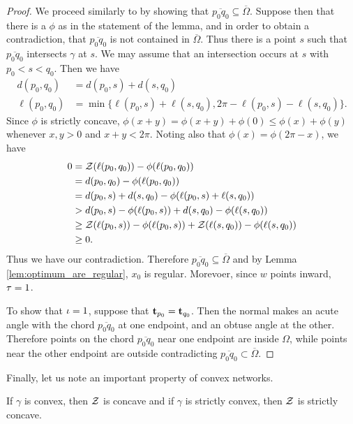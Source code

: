 \documentclass[12pt]{amsart}
\begin{document}
\begin{proof}
We proceed similarly to \cite{MR2794630} by showing that $\overline{p_0q_0} \subseteq \overline{\Omega}$. Suppose then that there is a $\phi$ as in the statement of the lemma, and in order to obtain a contradiction, that $\overline{p_0q_0}$ is not contained in $\overline{\Omega}$. Thus there is a point $s$ such that $\overline{p_0q_0}$ intersects $\gamma$ at $s$. We may assume that an intersection occurs at $s$ with $p_0 < s < q_0$. Then we have
\begin{align*}
d(p_0, q_0) &= d(p_0, s) + d(s, q_0) \\
\ell(p_0, q_0) &= \min\{\ell(p_0, s) + \ell(s, q_0),  2\pi -\ell(p_0,s ) - \ell(s, q_0)\}.
\end{align*}
Since $\phi$ is strictly concave, $\phi(x + y) = \phi(x + y) + \phi(0) \leq \phi(x) + \phi(y)$ whenever $x, y > 0$ and $x + y < 2\pi$. Noting also that $\phi(x) = \phi(2\pi - x)$, we have
\[
\begin{split}
0 &= \operatorname{\mathcal{Z}}(\ell(p_0, q_0)) - \phi(\ell(p_0, q_0)) \\
&=  d(p_0, q_0) - \phi(\ell(p_0, q_0)) \\
&= d(p_0, s) + d(s, q_0) - \phi(\ell(p_0, s) + \ell(s,  q_0)) \\
&> d(p_0, s) - \phi(\ell(p_0, s)) + d(s, q_0) - \phi(\ell(s, q_0)) \\
&\geq \operatorname{\mathcal{Z}}(\ell(p_0, s)) - \phi(\ell(p_0, s)) + \operatorname{\mathcal{Z}}(\ell(s, q_0)) - \phi(\ell(s, q_0)) \\
&\geq 0.
\end{split}
\]
Thus we have our contradiction. Therefore $\overline{p_0q_0} \subseteq \overline{\Omega}$ and by Lemma \ref{lem:optimum_are_regular}, \(x_0\) is regular. Morevoer, since $w$ points inward, $\operatorname{\tau} = 1$.

To show that $\operatorname{\iota} = 1$, suppose that $\operatorname{\mathbf{t}}_{p_0} = \operatorname{\mathbf{t}}_{q_0}$. Then the normal makes an acute angle with the chord $\overline{p_0 q_0}$ at one endpoint, and an obtuse angle at the other. Therefore points on the chord $\overline{p_0q_0}$ near one endpoint are inside $\Omega$, while points near the other endpoint are outside contradicting $\overline{p_0q_0} \subset \overline{\Omega}$.
\end{proof}

Finally, let us note an important property of convex networks.

\begin{theorem}
\label{thm:convex_network_concave_profile}

If $\gamma$ is convex, then $\operatorname{\mathcal{Z}}$ is concave and if $\gamma$ is strictly convex, then $\operatorname{\mathcal{Z}}$ is strictly concave.
\end{theorem}
\end{document}
